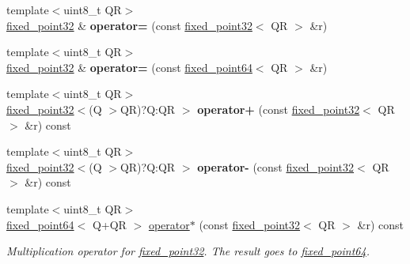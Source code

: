 \begin{DoxyCompactItemize}
\mbox{\label{structaacio_1_1fixed__point32_a72eae167802f0eebcd79d8530417ddac}} 
{\footnotesize template$<$uint8\+\_\+t QR$>$ }\\\mbox{\hyperlink{structaacio_1_1fixed__point32}{fixed\+\_\+point32}} \& {\bfseries operator=} (const \mbox{\hyperlink{structaacio_1_1fixed__point32}{fixed\+\_\+point32}}$<$ QR $>$ \&r)
\item 
\mbox{\label{structaacio_1_1fixed__point32_a9e6369e0331dbcc4b5782f18476bd645}} 
{\footnotesize template$<$uint8\+\_\+t QR$>$ }\\\mbox{\hyperlink{structaacio_1_1fixed__point32}{fixed\+\_\+point32}} \& {\bfseries operator=} (const \mbox{\hyperlink{structaacio_1_1fixed__point64}{fixed\+\_\+point64}}$<$ QR $>$ \&r)
\item 
\mbox{\label{structaacio_1_1fixed__point32_a46b0e723e175b8904521aca034857868}} 
{\footnotesize template$<$uint8\+\_\+t QR$>$ }\\\mbox{\hyperlink{structaacio_1_1fixed__point32}{fixed\+\_\+point32}}$<$(Q $>$QR)?Q\+:\+QR $>$ {\bfseries operator+} (const \mbox{\hyperlink{structaacio_1_1fixed__point32}{fixed\+\_\+point32}}$<$ QR $>$ \&r) const
\item 
\mbox{\label{structaacio_1_1fixed__point32_a3492116354eee927aa189a561e6bc4a4}} 
{\footnotesize template$<$uint8\+\_\+t QR$>$ }\\\mbox{\hyperlink{structaacio_1_1fixed__point32}{fixed\+\_\+point32}}$<$(Q $>$QR)?Q\+:\+QR $>$ {\bfseries operator-\/} (const \mbox{\hyperlink{structaacio_1_1fixed__point32}{fixed\+\_\+point32}}$<$ QR $>$ \&r) const
\item 
{\footnotesize template$<$uint8\+\_\+t QR$>$ }\\\mbox{\hyperlink{structaacio_1_1fixed__point64}{fixed\+\_\+point64}}$<$ Q+QR $>$ \mbox{\hyperlink{group__fixedpoint_gae967c9f563576da13c0ba7617aaea623}{operator$\ast$}} (const \mbox{\hyperlink{structaacio_1_1fixed__point32}{fixed\+\_\+point32}}$<$ QR $>$ \&r) const
\begin{DoxyCompactList}\small\item\em Multiplication operator for \mbox{\hyperlink{structaacio_1_1fixed__point32}{fixed\+\_\+point32}}. The result goes to \mbox{\hyperlink{structaacio_1_1fixed__point64}{fixed\+\_\+point64}}. \end{DoxyCompactList}\item 

\end{DoxyCompactItemize}
